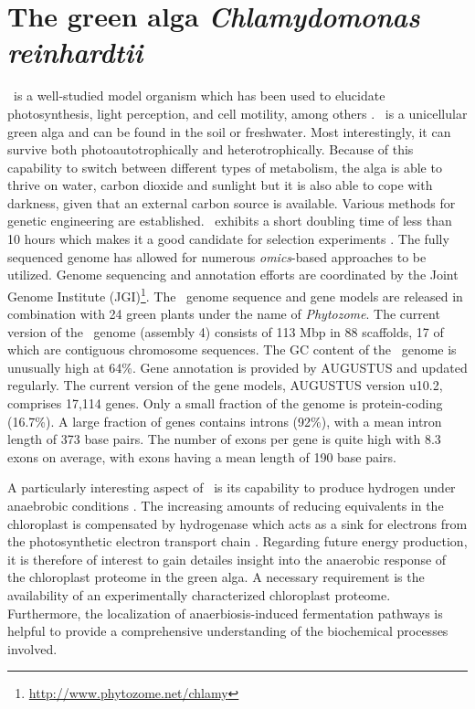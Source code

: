 \section{The green alga {\em Chlamydomonas reinhardtii}}

\chlre~is a well-studied model organism which has been used to elucidate 
photosynthesis, light perception, and cell motility, among others 
\citep{Harris2001}.
\cre~is a unicellular green alga and can be found in the soil or freshwater.
Most interestingly, it can survive both photoautotrophically and 
heterotrophically.
Because of this capability to switch between different types of metabolism, 
the alga is able to thrive on water, carbon dioxide and sunlight but it is
also able to cope with darkness, given that an external carbon source is 
available.
Various methods for genetic engineering are established.
\cre~exhibits a short doubling time of less than 10 hours which makes it 
a good candidate for selection experiments \citep{Dent2001}.
The fully sequenced genome \citep{Merchant2007} has allowed for numerous 
{\em omics}-based approaches to be utilized.
Genome sequencing and annotation efforts are coordinated by the Joint Genome 
Institute (JGI)\footnote{\href{http://www.phytozome.net/chlamy}{http://www.phytozome.net/chlamy}}.
The \cre~genome sequence and gene models are released in combination with
24 green plants under the name of {\em Phytozome}.
The current version of the \cre~genome (assembly 4) consists of 113 Mbp in 88 
scaffolds, 17 of which are contiguous chromosome sequences.
The GC content of the \cre~genome is unusually high at 64\%.
Gene annotation is provided by AUGUSTUS and updated regularly.
The current version of the gene models, AUGUSTUS version u10.2, comprises
17,114 genes.
Only a small fraction of the genome is protein-coding (16.7\%).
A large fraction of genes contains introns (92\%), with a mean intron length
of 373 base pairs.
The number of exons per gene is quite high with 8.3 exons on average, with
exons having a mean length of 190 base pairs.

A particularly interesting aspect of \cre~is its capability to produce
hydrogen under anaebrobic conditions \citep{Greenbaum1982}.
The increasing amounts of reducing equivalents in the chloroplast is
compensated by hydrogenase which acts as a sink for electrons from
the photosynthetic electron transport chain \citep{Hemschemeier2011}.
Regarding future energy production, it is therefore of interest to gain 
detailes insight into the anaerobic response of the chloroplast proteome in
the green alga.
A necessary requirement is the availability of an experimentally characterized
chloroplast proteome. 
Furthermore, the localization of anaerbiosis-induced fermentation pathways
is helpful to provide a comprehensive understanding of the biochemical 
processes involved.


